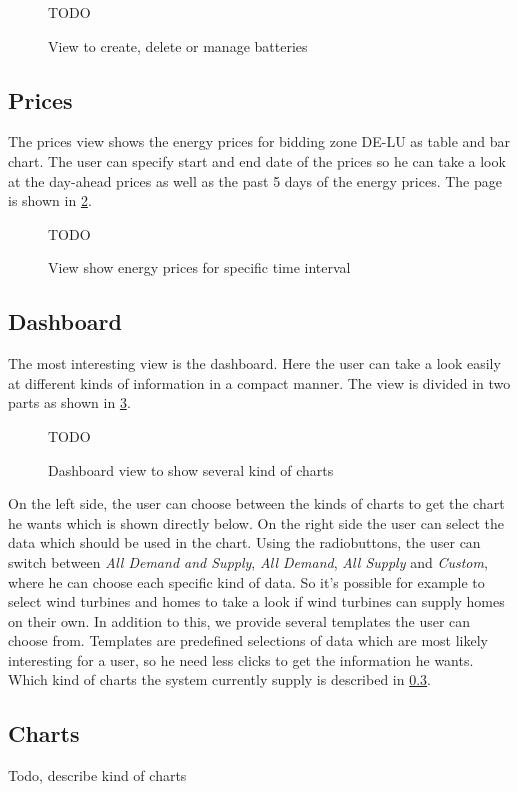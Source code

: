 \begin{figure}[!h]
    \centering
    TODO%
    \caption{View to create, delete or manage batteries}
    \label{fig:batteries}
\end{figure}



\subsection{Prices}
The prices view shows the energy prices for bidding zone DE-LU as table and bar chart.
The user can specify start and end date of the prices so he can take a look at the day-ahead prices as well as the past 5 days of the energy prices.
The page is shown in \cref{fig:prices}.

\begin{figure}[!h]
    \centering
    TODO%
    \caption{View show energy prices for specific time interval}
    \label{fig:prices}
\end{figure}

\subsection{Dashboard}
The most interesting view is the dashboard.
Here the user can take a look easily at different kinds of information in a compact manner.
The view is divided in two parts as shown in \cref{fig:dashboard}.

\begin{figure}[!h]
    \centering
    TODO%
    \caption{Dashboard view to show several kind of charts}
    \label{fig:dashboard}
\end{figure}

On the left side, the user can choose between the kinds of charts to get the chart he wants which is shown directly below.
On the right side the user can select the data which should be used in the chart.
Using the radiobuttons, the user can switch between \textit{All Demand and Supply}, \textit{All Demand}, \textit{All Supply} and \textit{Custom}, where he can choose each specific kind of data.
So it's possible for example to select wind turbines and homes to take a look if wind turbines can supply homes on their own.
In addition to this, we provide several templates the user can choose from.
Templates are predefined selections of data which are most likely interesting for a user, so he need less clicks to get the information he wants.
Which kind of charts the system currently supply is described in \cref{sec:charts}.

\subsection{Charts}\label{sec:charts}
Todo, describe kind of charts